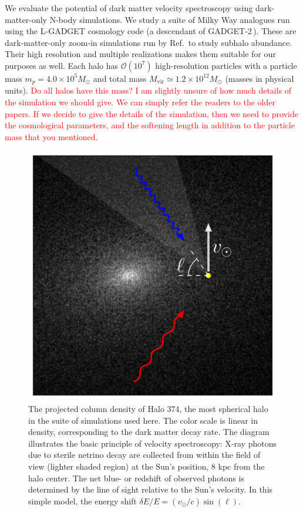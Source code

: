 \documentclass[aps,prd,10pt,twocolumn,superscriptaddress,showpacs]{revtex4-1}
\begin{document}
We evaluate the potential of dark matter velocity spectroscopy using dark-matter-only N-body simulations.  We study a suite of Milky Way analogues run using the L-GADGET cosmology code (a descendant of GADGET-2\,\cite{springel2005}). These are dark-matter-only zoom-in simulations run by Ref.\,\cite{mao2015} to study subhalo abundance. Their high resolution and multiple realizations makes them suitable for our purposes as well. Each halo has $\mathcal{O}(10^7)$ high-resolution particles with a particle mass $m_p=4.0 \times 10^5 M_{\odot}$ and total  mass $M_{\mathrm{vir}}\simeq1.2\times10^{12} M_{\odot}$ (masses in physical units).  \textcolor{red}{Do all halos have this mass?  I am slightly unsure of how much details of the simulation we should give.  We can simply refer the readers to the older papers.  If we decide to give the details of the simulation, then we need to provide the cosmological parameters, and the softening length in addition to the particle mass that you mentioned.}

\begin{figure}[h!]
\centering
\includegraphics[width=0.9\columnwidth]{vspec_diagram.png}
\caption{The projected column density of Halo 374, the most spherical halo in the suite of
	simulations used here. The color scale is linear in density,
corresponding to the dark matter decay rate. The diagram illustrates the basic principle of velocity
spectroscopy: X-ray photons due to sterile netrino decay are collected from within the field
of view (lighter shaded region) at the Sun's position, 8 kpc from the halo center. The net blue- or redshift of observed photons 
is determined by the line of sight relative to the Sun's velocity. In this simple model, the energy
shift $\delta E/E=(v_\odot/c)\sin(\ell)$.}
\label{fig:halo374}
\end{figure}
\end{document}
